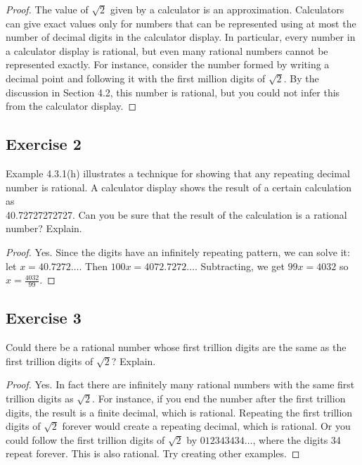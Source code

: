 \documentclass[14pt]{extarticle}
\begin{document}
\begin{proof}
    The value of $\sqrt{2}$ given by a calculator is an approximation. Calculators can give exact values only for numbers that can be represented using at most the number of
    decimal digits in the calculator display. In particular, every number in a calculator display is rational, but even many rational numbers cannot be represented exactly. For instance, consider the number formed by writing a decimal point and following it with the first million digits of $\sqrt{2}$. By the discussion in Section 4.2, this number is rational, but you could not infer this from the calculator display.
\end{proof}

\subsection{Exercise 2}
Example 4.3.1(h) illustrates a technique for showing that any repeating decimal number is rational. A calculator display shows the result of a certain calculation as \\ 40.72727272727. Can you be sure that the result of the calculation is a rational number? Explain.

\begin{proof}
    Yes. Since the digits have an infinitely repeating pattern, we can solve it: let $x = 40.7272\ldots$. Then $100x = 4072.7272\ldots$. Subtracting, we get $99x = 4032$ so $x = \frac{4032}{99}$.
\end{proof}

\subsection{Exercise 3}
Could there be a rational number whose first trillion digits are the same as the first trillion digits of $\sqrt{2}$? Explain.

\begin{proof}
    Yes. In fact there are infinitely many rational numbers
    with the same first trillion digits as $\sqrt{2}$. For instance, if you end the number after the first trillion digits, the result is a finite decimal, which is rational. Repeating the first trillion digits of $\sqrt{2}$ forever would create a repeating decimal, which is rational. Or you could follow the first trillion digits of $\sqrt{2}$ by $012343434\ldots$, where the digits 34 repeat forever. This is also rational. Try creating other examples.
\end{proof}
\end{document}
